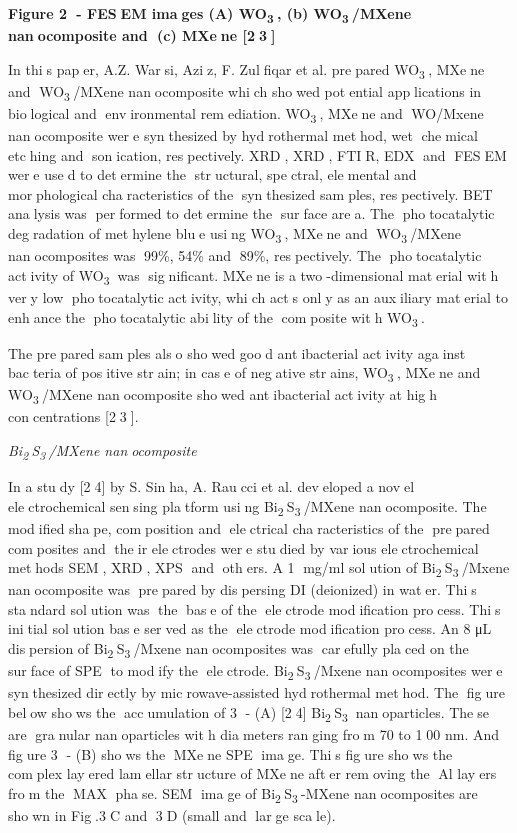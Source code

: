 {{\bfseries Figure 2 - FESEM images (A) WO\textsubscript{3}, (b)
WO\textsubscript{3}/MXene nanocomposite and (c) MXene {[}23{]}}

In this paper, A.Z. Warsi, Aziz, F. Zulfiqar et al. prepared
WO\textsubscript{3}, MXene and WO\textsubscript{3}/MXene
nanocomposite which showed potential applications in biological
and environmental remediation. WO\textsubscript{3}, MXene and
WO/Mxene nanocomposite were synthesized by hydrothermal method,
wet chemical etching and sonication, respectively. XRD, XRD,
FTIR, EDX and FESEM were used to determine the structural,
spectral, elemental and morphological characteristics of the
synthesized samples, respectively. BET analysis was performed to
determine the surface area. The photocatalytic degradation of
methylene blue using WO\textsubscript{3}, MXene and
WO\textsubscript{3}/MXene nanocomposites was 99\%, 54\% and 89\%,
respectively. The photocatalytic activity of WO\textsubscript{3}
was significant. MXene is a two-dimensional material with very
low photocatalytic activity, which acts only as an auxiliary
material to enhance the photocatalytic ability of the composite
with WO\textsubscript{3}.

The prepared samples also showed good antibacterial activity
against bacteria of positive strain; in case of negative strains,
WO\textsubscript{3}, MXene and WO\textsubscript{3}/MXene
nanocomposite showed antibacterial activity at high concentrations
{[}23{]}.

\emph{Bi\textsubscript{2}S\textsubscript{3}/MXene nanocomposite}

In a study {[}24{]} by S. Sinha, A. Raucci et al. developed a
novel electrochemical sensing platform using
Bi\textsubscript{2}S\textsubscript{3}/MXene nanocomposite. The
modified shape, composition and electrical characteristics of the
prepared composites and their electrodes were studied by various
electrochemical methods SEM, XRD, XPS and others. A 1 mg/ml
solution of Bi\textsubscript{2}S\textsubscript{3}/Mxene
nanocomposite was prepared by dispersing DI (deionized) in water.
This standard solution was the base of the electrode
modification process. This initial solution base served as the
electrode modification process. An 8 μL dispersion of
Bi\textsubscript{2}S\textsubscript{3}/Mxene nanocomposites was
carefully placed on the surface of SPE to modify the electrode.
Bi\textsubscript{2}S\textsubscript{3}/Mxene nanocomposites were
synthesized directly by microwave-assisted hydrothermal method.
The figure below shows the accumulation of 3 - (A) {[}24{]}
Bi\textsubscript{2}S\textsubscript{3} nanoparticles. These are
granular nanoparticles with diameters ranging from 70 to 100 nm.
And figure 3 - (B) shows the MXene SPE image. This figure
shows the complex layered lamellar structure of MXene after
removing the Al layers from the MAX phase. SEM image of
Bi\textsubscript{2}S\textsubscript{3}-MXene nanocomposites are
shown in Fig.3C and 3D (small and large scale).

}
